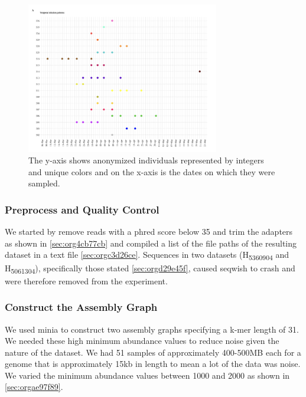\documentclass[10pt, a4paper]{article}
\begin{document}
\begin{figure}[h]
\centering
\includegraphics[width=0.75\textwidth]{../Figures/RSV/Githinji_HH_5_temporal_distribution.png}
\caption[Temporal Distribution of RSV Sample Collection]{\label{fig:org8edcf70}
The y-axis shows anonymized individuals represented by integers and unique colors and on the x-axis is the dates on which they were sampled.}
\end{figure}

\subsubsection{Preprocess and Quality Control}
\label{sec:orgfab9c78}
We started by remove reads with a phred score below 35 and trim the adapters as
shown in \ref{sec:org4cb77cb} and compiled a list of the file paths of the resulting 
dataset in a text file  \ref{sec:orgc3d26ce}.
Sequences in two datasets (H\textsubscript{536}\textsubscript{09}\textsubscript{04} and H\textsubscript{506}\textsubscript{13}\textsubscript{04}), specifically those 
stated \ref{sec:orgd29e45f}, caused seqwish to crash and were therefore removed from the 
experiment.

\subsubsection{Construct the Assembly Graph}
\label{sec:orgb2bee18}
We used minia \cite{chikhiSpaceefficientExactBruijn2013} to construct two assembly
graphs specifying a k-mer length of 31.
We needed these high minimum abundance values to reduce noise given the nature 
of the dataset. We had 51 samples of approximately 400-500MB each for a genome 
that is approximately 15kb in length to mean a lot of the data was noise.
We varied the minimum abundance values between 1000 and 2000 as shown in
\ref{sec:orgae97f89}. 
\end{document}

